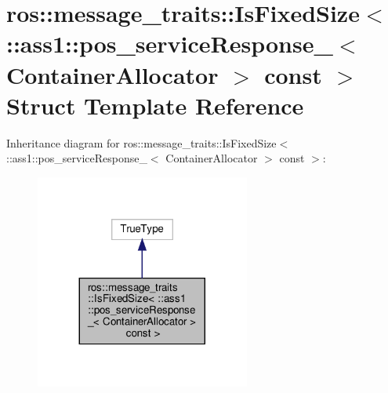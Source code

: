 \hypertarget{structros_1_1message__traits_1_1IsFixedSize_3_01_1_1ass1_1_1pos__serviceResponse___3_01ContainerAllocator_01_4_01const_01_4}{}\section{ros\+:\+:message\+\_\+traits\+:\+:Is\+Fixed\+Size$<$ \+:\+:ass1\+:\+:pos\+\_\+service\+Response\+\_\+$<$ Container\+Allocator $>$ const $>$ Struct Template Reference}
\label{structros_1_1message__traits_1_1IsFixedSize_3_01_1_1ass1_1_1pos__serviceResponse___3_01ContainerAllocator_01_4_01const_01_4}


Inheritance diagram for ros\+:\+:message\+\_\+traits\+:\+:Is\+Fixed\+Size$<$ \+:\+:ass1\+:\+:pos\+\_\+service\+Response\+\_\+$<$ Container\+Allocator $>$ const $>$\+:
\nopagebreak
\begin{figure}[H]
\begin{center}
\leavevmode
\includegraphics[width=200pt]{structros_1_1message__traits_1_1IsFixedSize_3_01_1_1ass1_1_1pos__serviceResponse___3_01Container3297b2f763d7b7e49c44aa594882237d}
\end{center}
\end{figure}


